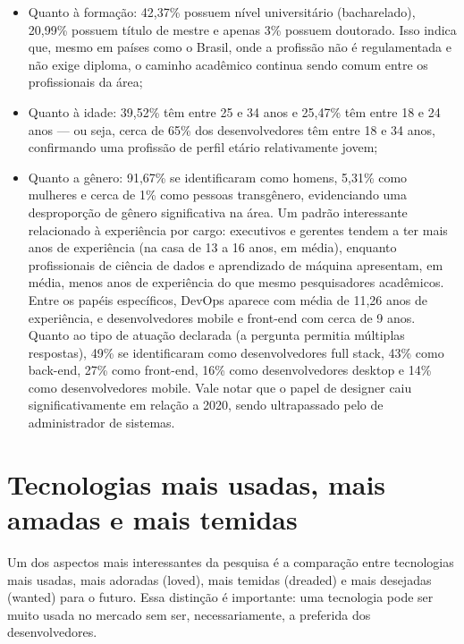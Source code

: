 \begin{itemize}
  \item Quanto à formação: 42,37\% possuem nível universitário (bacharelado), 20,99\% possuem título de mestre e apenas 3\% possuem doutorado. Isso indica que, mesmo em países como o Brasil, onde a profissão não é regulamentada e não exige diploma, o caminho acadêmico continua sendo comum entre os profissionais da área;
  \item Quanto à idade: 39,52\% têm entre 25 e 34 anos e 25,47\% têm entre 18 e 24 anos — ou seja, cerca de 65\% dos desenvolvedores têm entre 18 e 34 anos, confirmando uma profissão de perfil etário relativamente jovem;
  \item Quanto a gênero: 91,67\% se identificaram como homens, 5,31\% como mulheres e cerca de 1\% como pessoas transgênero, evidenciando uma desproporção de gênero significativa na área. Um padrão interessante relacionado à experiência por cargo: executivos e gerentes tendem a ter mais anos de experiência (na casa de 13 a 16 anos, em média), enquanto profissionais de ciência de dados e aprendizado de máquina apresentam, em média, menos anos de experiência do que mesmo pesquisadores acadêmicos. Entre os papéis específicos, DevOps aparece com média de 11,26 anos de experiência, e desenvolvedores mobile e front-end com cerca de 9 anos. Quanto ao tipo de atuação declarada (a pergunta permitia múltiplas respostas), 49\% se identificaram como desenvolvedores full stack, 43\% como back-end, 27\% como front-end, 16\% como desenvolvedores desktop e 14\% como desenvolvedores mobile. Vale notar que o papel de designer caiu significativamente em relação a 2020, sendo ultrapassado pelo de administrador de sistemas.
\end{itemize}

\section{Tecnologias mais usadas, mais amadas e mais temidas}

Um dos aspectos mais interessantes da pesquisa é a comparação entre tecnologias mais usadas, mais adoradas (loved), mais temidas (dreaded) e mais desejadas (wanted) para o futuro. Essa distinção é importante: uma tecnologia pode ser muito usada no mercado sem ser, necessariamente, a preferida dos desenvolvedores.


